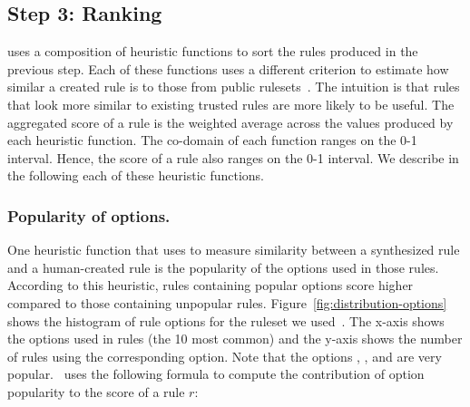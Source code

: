 \documentclass[conference]{IEEEtran}
\begin{document}

\subsection{Step 3: Ranking}
\label{sec:ranking}

\tname{} uses a composition of heuristic functions to sort the rules
produced in the previous step. Each of these functions uses a
different criterion to estimate how similar a created rule is to those
from public rulesets~\cite{emerging-threats-open}. The intuition is
that rules that look more similar to existing trusted rules are more
likely to be useful. The aggregated score of a rule is the weighted
average across the values produced by each heuristic function. The
co-domain of each function ranges on the 0-1 interval. Hence, the score
of a rule also ranges on the 0-1 interval. We describe in the
following each of these heuristic functions.



\subsubsection{\label{sec:popularity-options}Popularity of options.}
One heuristic function that \tname{} uses to measure similarity
between a synthesized rule and a human-created rule is the popularity
of the options used in those rules. According to this heuristic, rules
containing popular options score higher compared to those containing
unpopular rules. Figure~\ref{fig:distribution-options} shows the
histogram of rule options for the ruleset we
used~\cite{emerging-threats-open}. The x-axis shows the options used
in rules (the 10 most common) and the y-axis shows the number of rules
using the corresponding option. Note that the options
, , and  are very
popular. \tname\ uses the following formula to compute the
contribution of option popularity to the score of a rule $r$:
\end{document}
